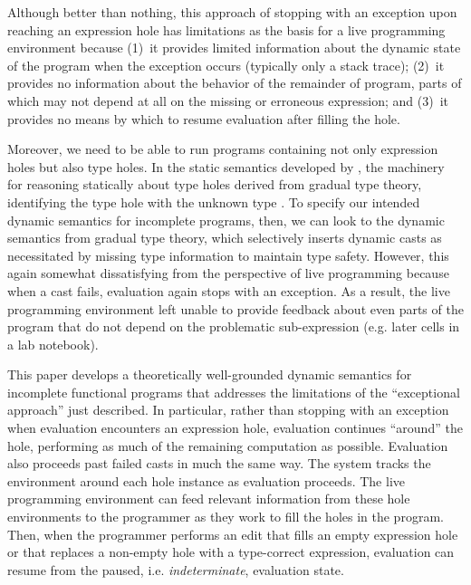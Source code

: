 Although better than nothing, this approach of stopping with an exception upon reaching an expression hole has limitations 
as the basis for a live programming environment because 
(1)~it provides limited information about the dynamic state of the program when the exception occurs
(typically only a stack trace);  
(2)~it provides no information about the behavior of the remainder of program, 
parts of which may not depend at all on the missing or erroneous expression; and 
(3)~it provides no means by which to resume evaluation after filling the hole.

Moreover, we need to be able to run programs containing not only expression holes but also type holes.
In the static semantics developed by \citet{popl-paper}, the machinery for 
reasoning statically about type holes \IS derived from gradual type theory, 
identifying the type hole with the unknown type \cite{DBLP:conf/snapl/SiekVCB15,Siek06a}. 
To specify our intended dynamic semantics for incomplete programs, then, we can look to the dynamic semantics from
gradual type theory, which selectively inserts dynamic casts as necessitated by missing type information to maintain type safety. 
However, this \IS again somewhat dissatisfying from the perspective of live programming because when a cast fails, evaluation again stops with 
an exception. As a result, the live programming environment \IS left unable to provide feedback about even parts 
of the program that do not depend on the problematic sub-expression (e.g. later cells in a lab notebook).



This paper develops a theoretically well-grounded dynamic semantics for incomplete functional programs that addresses the limitations of the ``exceptional approach'' just described. 
In particular, rather than stopping with an exception when evaluation encounters an expression hole, evaluation continues ``around'' the hole, performing as much of the remaining computation as possible. 
Evaluation also proceeds past failed casts in much the same way. 
The system tracks the environment around each hole instance as evaluation proceeds. 
The live programming environment can feed relevant information from these hole environments to the programmer as they work to fill the holes in the program. 
Then, when the programmer performs an edit that fills an empty expression hole or that replaces a non-empty hole with a type-correct expression, evaluation can resume from the paused, i.e. \emph{indeterminate}, evaluation state.

